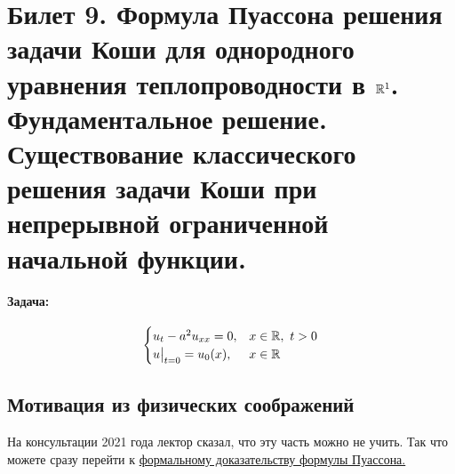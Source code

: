\documentclass[../main.tex]{subfiles}
\begin{document}
\section{Билет 9. Формула Пуассона решения задачи Коши для однородного уравнения теплопроводности в \texorpdfstring{$\mathbb{R}^1$}{R}. Фундаментальное решение. Существование классического решения задачи Коши при непрерывной ограниченной начальной функции.}

\paragraph{Задача:}
\begin{equation*}
\begin{cases}
	u_t - a^2u_{xx} = 0, &x \in \mathbb{R},\ t > 0 \\
	u\bigr|_{t = 0} = u_0(x), &x \in \mathbb{R}
\end{cases}
\end{equation*}

\subsection{Мотивация из физических соображений}

На консультации 2021 года лектор сказал, что эту часть можно не учить. Так что можете сразу перейти к \hyperref[sec:FormalProof]{формальному доказательству формулы Пуассона.}
\vspace{0.7em}
\end{document}
